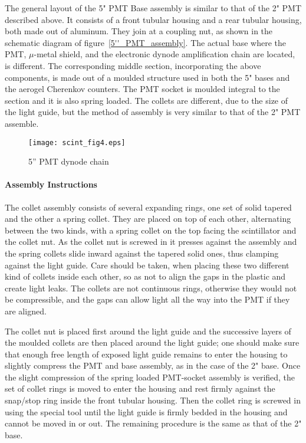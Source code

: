 \documentclass[12pt]{article}
\begin{document}
   The general layout of the 5" PMT Base assembly is similar to that of the 2" PMT
described above. It consists of a front tubular housing and a rear tubular
housing, both made out of aluminum. They join at a coupling nut, as shown in
the schematic diagram of figure~\ref{5''_PMT_assembly}. The actual base where the PMT, $\mu$-metal
shield, and the electronic dynode amplification chain are located, is
different. The corresponding middle section, incorporating the above
components, is made out of a moulded structure used in both the 5" bases and
the aerogel Cherenkov counters. The PMT socket is moulded integral to the
section and it is also spring loaded. The collets are different, due to the
size of the light guide, but the method of assembly is very similar to that of
the 2" PMT assemble. 

\begin{figure}
\begin{center}
\texttt{[image: scint\_fig4.eps]}
{\linespread{1.}
\caption[The 5" PMT base used in S3  trigger scintillators]{5'' PMT dynode chain}
\label{S3_PMT_dynode_chain}}
\end{center}
\end{figure}

\paragraph{Assembly Instructions}

   The collet assembly consists of several expanding rings, one set of solid
tapered and the other a spring collet. They are placed on top of each other,
alternating between the two kinds, with a spring collet on the top facing the
scintillator and the collet nut. As the collet nut is screwed in it presses
against the assembly and the spring collets slide inward against the tapered
solid ones, thus clamping against the light guide. Care should be taken, when
placing these two different kind of collets inside each other, so as not to
align the gaps in the plastic and create light leaks. The collets are not
continuous rings, otherwise they would not be compressible, and the gaps can
allow light all the way into the PMT if they are aligned. 

The collet nut is placed first around the light guide and the successive layers 
of the moulded collets are then placed around the light guide; one should make 
sure that enough free length of exposed light guide remains to enter the 
housing to slightly compress the PMT and base assembly, as in the case of the 
2" base. Once the slight compression of the spring loaded PMT-socket assembly 
is verified, the set of collet rings is moved to enter the housing and rest 
firmly against the snap/stop ring inside the front tubular housing. Then the 
collet ring is screwed in using the special tool until the light guide is 
firmly bedded in the housing and cannot be moved in or out. The remaining 
procedure is the same as that of the 2" base.
\end{document}
